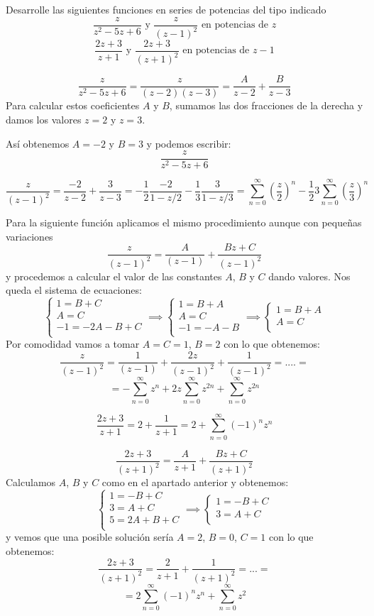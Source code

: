 \begin{problem}[15]
Desarrolle las siguientes funciones en series de potencias del tipo indicado
\ppart
\[\frac{z}{z^2-5z+6} \text{ y } \frac{z}{(z-1)^2} \text{ en potencias de } z\]
\ppart
\[\frac{2z+3}{z+1} \text{ y } \frac{2z+3}{(z+1)^2} \text{ en potencias de } z-1\]

\solution
{}

\spart
\[\frac{z}{z^2-5z+6} = \frac{z}{(z-2)(z-3)} = \frac{A}{z-2}+\frac{B}{z-3}\]
Para calcular estos coeficientes $A$ y $B$, sumamos las dos fracciones de la derecha y damos los valores $z=2$ y $z=3$.

Así obtenemos $A=-2$ y $B=3$ y podemos escribir:
\[\frac{z}{z^2-5z+6}\]

\[\frac{z}{(z-1)^2}= \frac{-2}{z-2}+\frac{3}{z-3} = -\frac{1}{2}\frac{-2}{1-z/2}-\frac{1}{3}\frac{3}{1-z/3} = \sum_{n=0}^{\infty} \left(\frac{z}{2}\right)^n -\frac{1}{2}3\sum_{n=0}^{\infty}\left(\frac{z}{3}\right)^n \]

Para la siguiente función aplicamos el mismo procedimiento aunque con pequeñas variaciones
\[\frac{z}{(z-1)^2}=\frac{A}{(z-1)}+\frac{Bz+C}{(z-1)^2}\]
y procedemos a calcular el valor de las constantes $A$, $B$ y $C$ dando valores. Nos queda el sistema de ecuaciones:
\[\begin{cases}
	1=B+C\\
	A=C \\
	-1=-2A-B+C \\
	\end{cases} \implies \begin{cases}
	1=B+A\\
	A=C \\
	-1=-A-B \\
	\end{cases} \implies \begin{cases}
	1=B+A\\
	A=C \\
	\end{cases}\]
Por comodidad vamos a tomar $A=C=1$, $B=2$ con lo que obtenemos:
\[\frac{z}{(z-1)^2}=\frac{1}{(z-1)}+\frac{2z}{(z-1)^2}+\frac{1}{(z-1)^2} = .... =\]
\[= -\sum_{n=0}^{\infty} z^n+2z\sum_{n=0}^{\infty}z^{2n}+\sum_{n=0}^{\infty}z^{2n}\]

\spart
\[\frac{2z+3}{z+1} = 2 + \frac{1}{z+1}= 2 +\sum_{n=0}^{\infty}(-1)^nz^n\]

\[\frac{2z+3}{(z+1)^2} = \frac{A}{z+1}+\frac{Bz+C}{(z+1)^2}\]
Calculamos $A$, $B$ y $C$ como en el apartado anterior y obtenemos:
\[\begin{cases}
	1=-B+C\\
	3=A+C \\
	5=2A+B+C \\
	\end{cases} \implies \begin{cases}
	1=-B+C\\
	3=A+C \\
	\end{cases} \]
	y vemos que una posible solución sería $A=2$, $B=0$, $C=1$
con lo que obtenemos:
\[\frac{2z+3}{(z+1)^2} = \frac{2}{z+1}+\frac{1}{(z+1)^2} = ... =\]
\[=2\sum_{n=0}^{\infty}(-1)^nz^n+\sum_{n=0}^{\infty}z^2\]
\end{problem}

